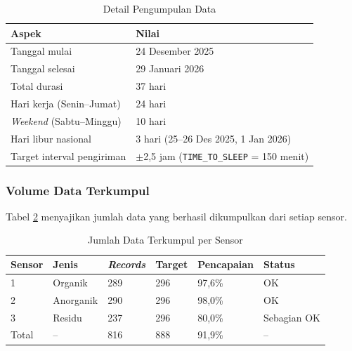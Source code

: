 \begin{table}[H]
  \caption{Detail Pengumpulan Data}
  \label{tab:detail-pengumpulan}
  \begin{tabularx}{\textwidth}{| l | X |}
    \hline
    \textbf{Aspek} & \textbf{Nilai} \\
    \hline
    Tanggal mulai & 24 Desember 2025 \\
    \hline
    Tanggal selesai & 29 Januari 2026 \\
    \hline
    Total durasi & 37 hari \\
    \hline
    Hari kerja (Senin--Jumat) & 24 hari \\
    \hline
    \textit{Weekend} (Sabtu--Minggu) & 10 hari \\
    \hline
    Hari libur nasional & 3 hari (25--26 Des 2025, 1 Jan 2026) \\
    \hline
    Target interval pengiriman & $\pm$2,5 jam (\texttt{TIME\_TO\_SLEEP} = 150 menit) \\
    \hline
  \end{tabularx}
\end{table}

\subsubsection{Volume Data Terkumpul}

Tabel \ref{tab:volume-data} menyajikan jumlah data yang berhasil dikumpulkan dari setiap sensor.

\begin{table}[H]
  \caption{Jumlah Data Terkumpul per Sensor}
  \label{tab:volume-data}
  \centering
  \begin{tabular}{| l | l | l | l | l | l |}
    \hline
    \textbf{Sensor} & \textbf{Jenis} & \textbf{\textit{Records}} & \textbf{Target} & \textbf{Pencapaian} & \textbf{Status} \\
    \hline
    1     & Organik   & 289 & 296 & 97,6\% & OK \\
    \hline
    2     & Anorganik & 290 & 296 & 98,0\% & OK \\
    \hline
    3     & Residu    & 237 & 296 & 80,0\% & Sebagian OK \\
    \hline
    Total & --        & 816 & 888 & 91,9\% & -- \\
    \hline
  \end{tabular}
\end{table}

